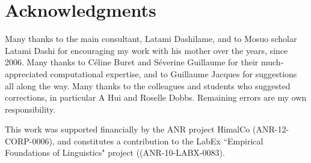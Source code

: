 	\section{Acknowledgments} \label{sec:ackno}

Many thanks to the main consultant, Latami Dashilame, and to Mosuo scholar Latami Dashi for encouraging my work with his mother over the years, since 2006. Many thanks to Céline Buret and Séverine Guillaume for their much-appreciated computational expertise, and to Guillaume Jacques for suggestions all along the way. Many thanks to the colleagues and students who suggested corrections, in particular A Hui and Roselle Dobbs. Remaining errors are my own responsibility. 

This work was supported financially by the ANR project HimalCo (ANR-12-CORP-0006), and constitutes a contribution to the LabEx “Empirical Foundations of Linguistics" project ((ANR-10-LABX-0083).

